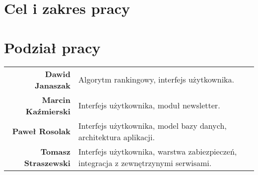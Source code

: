 \section{Cel i zakres pracy}


\section{Podział pracy}
\noindent\begin{tabular}{rp{9cm}}
\textbf{Dawid Janaszak} & Algorytm rankingowy, interfejs użytkownika.\\

\textbf{Marcin Kaźmierski} & Interfejs użytkownika, moduł newsletter.\\

\textbf{Paweł Rosolak} & Interfejs użytkownika, model bazy danych, architektura aplikacji.\\

\textbf{Tomasz Straszewski} & Interfejs użytkownika, warstwa zabiezpieczeń, integracja z zewnętrzynymi serwisami.\\
\end{tabular}

